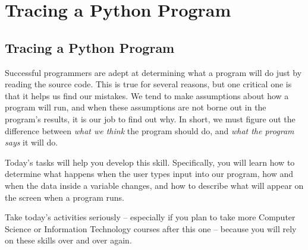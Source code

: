 
\chapter{Tracing a Python Program}
\label{day:tracing-python-1}


\section{Tracing a Python Program}

Successful programmers are adept at determining what a program will do just by reading the source code.  This is true for several reasons, but one critical one is that it helps us find our mistakes.  We tend to make assumptions about how a program will run, and when these assumptions are not borne out in the program's results, it is our job to find out why.  In short, we must figure out the difference between \textit{what we think} the program should do, and \textit{what the program says} it will do. 

Today's tasks will help you develop this skill.  Specifically, you will learn how to determine what happens when the user types input into our program, how and when the data inside a variable changes, and how to describe what will appear on the screen when a program runs.

Take today's activities seriously -- especially if you plan to take more Computer Science or Information Technology courses after this one -- because you will rely on these skills over and over again.